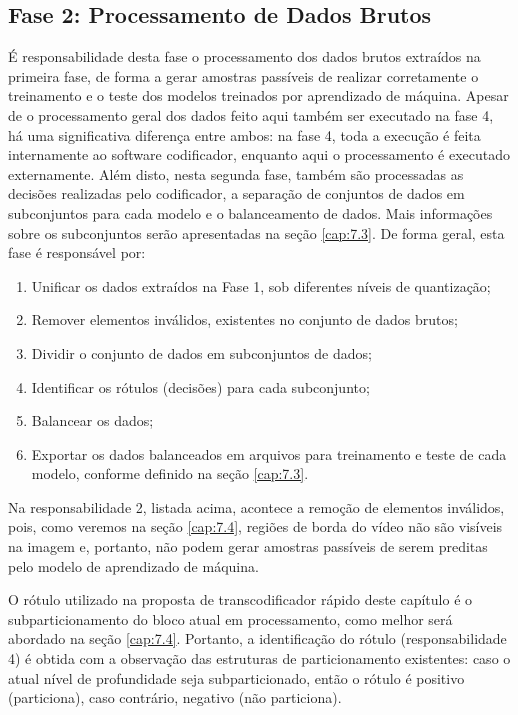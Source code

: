 \subsection{Fase 2: Processamento de Dados Brutos}
\label{cap:7.2.2}

É responsabilidade desta fase o processamento dos dados brutos extraídos na primeira fase, de forma a gerar amostras passíveis de realizar corretamente o treinamento e o teste dos modelos treinados por aprendizado de máquina. Apesar de o processamento geral dos dados feito aqui também ser executado na fase 4, há uma significativa diferença entre ambos: na fase 4, toda a execução é feita internamente ao software codificador, enquanto aqui o processamento é executado externamente. Além disto, nesta segunda fase, também são processadas as decisões realizadas pelo codificador, a separação de conjuntos de dados em subconjuntos para cada modelo e o balanceamento de dados. Mais informações sobre os subconjuntos serão apresentadas na seção \ref{cap:7.3}. De forma geral, esta fase é responsável por:

\begin{enumerate}[1.]
    \item Unificar os dados extraídos na Fase 1, sob diferentes níveis de quantização;

    \item Remover elementos inválidos, existentes no conjunto de dados brutos;

    \item Dividir o conjunto de dados em subconjuntos de dados;

    \item Identificar os rótulos (decisões) para cada subconjunto;

    \item Balancear os dados;

    \item Exportar os dados balanceados em arquivos para treinamento e teste de cada modelo, conforme definido na seção \ref{cap:7.3}.
\end{enumerate}

Na responsabilidade 2, listada acima, acontece a remoção de elementos inválidos, pois, como veremos na seção \ref{cap:7.4}, regiões de borda do vídeo não são visíveis na imagem e, portanto, não podem gerar amostras passíveis de serem preditas pelo modelo de aprendizado de máquina.

O rótulo utilizado na proposta de transcodificador rápido deste capítulo é o subparticionamento do bloco atual em processamento, como melhor será abordado na seção \ref{cap:7.4}. Portanto, a identificação do rótulo (responsabilidade 4) é obtida com a observação das estruturas de particionamento existentes: caso o atual nível de profundidade seja subparticionado, então o rótulo é positivo (particiona), caso contrário, negativo (não particiona).

